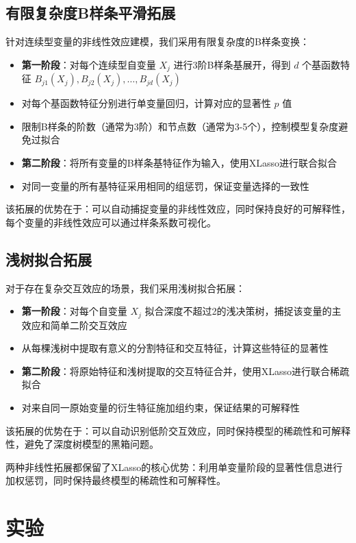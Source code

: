 \documentclass[12pt,a4paper]{article}
\begin{document}
\subsection{有限复杂度B样条平滑拓展}
针对连续型变量的非线性效应建模，我们采用有限复杂度的B样条变换：
\begin{itemize}
    \item \textbf{第一阶段}：对每个连续型自变量 $X_j$ 进行3阶B样条基展开，得到 $d$ 个基函数特征 $B_{j1}(X_j), B_{j2}(X_j), \dots, B_{jd}(X_j)$
    \item 对每个基函数特征分别进行单变量回归，计算对应的显著性 $p$ 值
    \item 限制B样条的阶数（通常为3阶）和节点数（通常为3-5个），控制模型复杂度避免过拟合
    \item \textbf{第二阶段}：将所有变量的B样条基特征作为输入，使用XLasso进行联合拟合
    \item 对同一变量的所有基特征采用相同的组惩罚，保证变量选择的一致性
\end{itemize}

该拓展的优势在于：可以自动捕捉变量的非线性效应，同时保持良好的可解释性，每个变量的非线性效应可以通过样条系数可视化。

\subsection{浅树拟合拓展}
对于存在复杂交互效应的场景，我们采用浅树拟合拓展：
\begin{itemize}
    \item \textbf{第一阶段}：对每个自变量 $X_j$ 拟合深度不超过2的浅决策树，捕捉该变量的主效应和简单二阶交互效应
    \item 从每棵浅树中提取有意义的分割特征和交互特征，计算这些特征的显著性
    \item \textbf{第二阶段}：将原始特征和浅树提取的交互特征合并，使用XLasso进行联合稀疏拟合
    \item 对来自同一原始变量的衍生特征施加组约束，保证结果的可解释性
\end{itemize}

该拓展的优势在于：可以自动识别低阶交互效应，同时保持模型的稀疏性和可解释性，避免了深度树模型的黑箱问题。

两种非线性拓展都保留了XLasso的核心优势：利用单变量阶段的显著性信息进行加权惩罚，同时保持最终模型的稀疏性和可解释性。

\section{实验}
\end{document}
